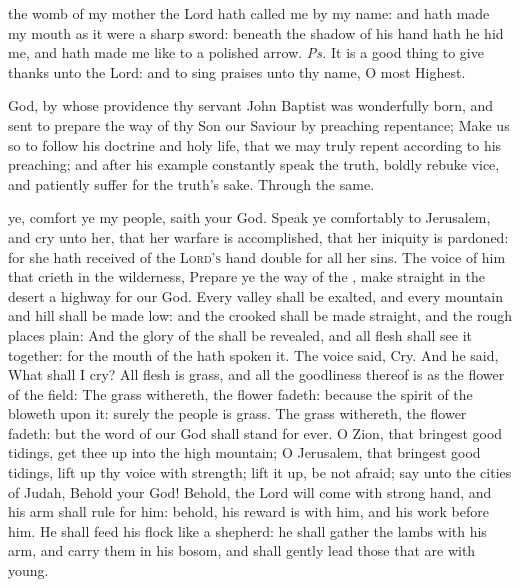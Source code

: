 \vspace{-0.2\baselineskip}

\introit

\vspace{-0.1\baselineskip}

 the womb of my mother the Lord hath called me by my name: and hath made my mouth as it were a sharp sword: beneath the shadow of his hand hath he hid me, and hath made me like to a polished arrow. \textit{Ps.} It is a good thing to give thanks unto the Lord: and to sing praises unto thy name, O most Highest.

\vspace{-0.25\baselineskip}

\collect\label{JohnCollect}

\vspace{-0.15\baselineskip}

 God, by whose providence thy servant John Baptist was wonderfully born, and sent to prepare the way of thy Son our Saviour by preaching repentance; Make us so to follow his doctrine and holy life, that we may truly repent according to his preaching; and after his example constantly speak the truth, boldly rebuke vice, and patiently suffer for the truth's sake. Through the same.

\vspace{-0.2\baselineskip}


\vspace{-0.1\baselineskip}

 ye, comfort ye my people, saith your God. Speak ye comfortably to Jerusalem, and cry unto her, that her warfare is accomplished, that her iniquity is pardoned: for she hath received of the {\textsc{Lord's}} hand double for all her sins. The voice of him that crieth in the wilderness, Prepare ye the way of the , make straight in the desert a highway for our God. Every valley shall be exalted, and every mountain and hill shall be made low: and the crooked shall be made straight, and the rough places plain: And the glory of the  shall be revealed, and all flesh shall see it together: for the mouth of the  hath spoken it. The voice said, Cry. And he said, What shall I cry? All flesh is grass, and all the goodliness thereof is as the flower of the field: The grass withereth, the flower fadeth: because the spirit of the  bloweth upon it: surely the people is grass. The grass withereth, the flower fadeth: but the word of our God shall stand for ever. O Zion, that bringest good tidings, get thee up into the high mountain; O Jerusalem, that bringest good tidings, lift up thy voice with strength; lift it up, be not afraid; say unto the cities of Judah, Behold your God! Behold, the Lord  will come with strong hand, and his arm shall rule for him: behold, his reward is with him, and his work before him. He shall feed his flock like a shepherd: he shall gather the lambs with his arm, and carry them in his bosom, and shall gently lead those that are with young.

